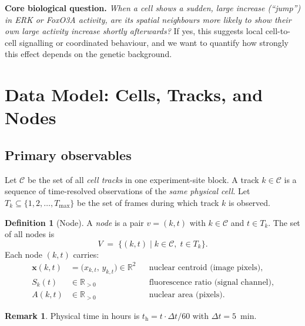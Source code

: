 \documentclass[11pt,a4paper]{article}
\theoremstyle{definition}
\newtheorem{definition}{Definition}[section]
\newtheorem{remark}{Remark}[section]
\theoremstyle{plain}
\newcommand{\sig}[2]{S_{#1}(#2)}
\newcommand{\1}[1]{\mathbf{1}\!\left[#1\right]}
\begin{document}
\bigskip
\begin{snugshade}
\noindent\textbf{Core biological question.}
\emph{When a cell shows a sudden, large increase (``jump'') in ERK or FoxO3A
activity, are its spatial neighbours more likely to show their own large
activity increase shortly afterwards?}
If yes, this suggests local cell-to-cell signalling or coordinated behaviour,
and we want to quantify how strongly this effect depends on the genetic
background.
\end{snugshade}

\section{Data Model: Cells, Tracks, and Nodes}

\subsection{Primary observables}

Let $\mathcal{C}$ be the set of all \emph{cell tracks} in one
experiment-site block. A track $k \in \mathcal{C}$ is a sequence of
time-resolved observations of the \emph{same physical cell}.
Let $T_k \subseteq \{1, 2, \ldots, T_{\max}\}$ be the set of frames during
which track $k$ is observed.

\begin{definition}[Node]\label{def:node}
A \emph{node} is a pair $v = (k,t)$ with $k \in \mathcal{C}$ and
$t \in T_k$. The set of all nodes is
\[
  V \;=\; \bigl\{(k,t) \;\big|\; k \in \mathcal{C},\; t \in T_k\bigr\}.
\]
Each node $(k,t)$ carries:
\begin{align*}
  \bm{x}(k,t) &= \bigl(x_{k,t},\, y_{k,t}\bigr) \in \mathbb{R}^2
    && \text{nuclear centroid (image pixels),}\\
  \sig{k}{t}  &\in \mathbb{R}_{>0}
    && \text{fluorescence ratio (signal channel),}\\
  A(k,t)      &\in \mathbb{R}_{>0}
    && \text{nuclear area (pixels).}
\end{align*}
\end{definition}

\begin{remark}
Physical time in hours is $t_{\mathrm{h}} = t \cdot \Delta t / 60$
with $\Delta t = 5$~min.
\end{remark}
\end{document}
